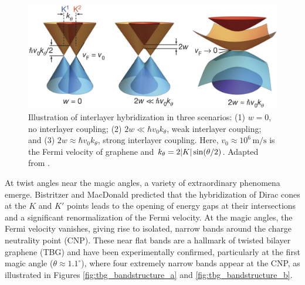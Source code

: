 \begin{figure}[H]
\centering
\includegraphics[width=0.70\linewidth]{fig/tbg_dirac_cones}
\caption{Illustration of interlayer hybridization in three scenarios: (1) \( w = 0 \), no interlayer coupling; (2) \( 2w \ll \hbar v_0 k_\theta \), weak interlayer coupling; and (3) \( 2w \approx \hbar v_0 k_\theta \), strong interlayer coupling. Here, \( v_0 \approx 10^6 \, \text{m/s} \) is the Fermi velocity of graphene and $k_\theta = 2 \abs{K} \sin(\theta/2)$. Adapted from \cite{cao2018_correlated}.}
\label{fig:tbg_dirac_cones}
\end{figure}

At twist angles near the magic angles, a variety of extraordinary phenomena emerge. Bistritzer and MacDonald \cite{macdonald2011} predicted that the hybridization of Dirac cones at the \(K\) and \(K'\) points leads to the opening of energy gaps at their intersections and a significant renormalization of the Fermi velocity. At the magic angles, the Fermi velocity vanishes, giving rise to isolated, narrow bands around the charge neutrality point (CNP). These near flat bands are a hallmark of twisted bilayer graphene (TBG) and have been experimentally confirmed, particularly at the first magic angle (\(\theta \approx 1.1^\circ\)), where four extremely narrow bands appear at the CNP, as illustrated in Figures \ref{fig:tbg_bandstructure_a} and \ref{fig:tbg_bandstructure_b}.


